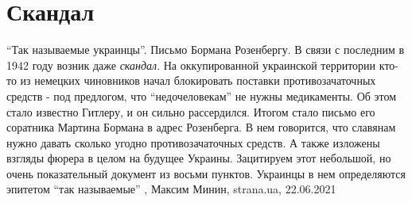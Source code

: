  
 
 
 
 
\chapter{Скандал}

\enquote{Так называемые украинцы}. Письмо Бормана Розенбергу.  В связи с последним в
1942 году возник даже \emph{скандал}. На оккупированной украинской территории кто-то
из немецких чиновников начал блокировать поставки противозачаточных средств -
под предлогом, что \enquote{недочеловекам} не нужны медикаменты.  Об этом стало
известно Гитлеру, и он сильно рассердился. Итогом стало письмо его соратника
Мартина Бормана в адрес Розенберга. В нем говорится, что славянам нужно давать
сколько угодно противозачаточных средств. А также изложены взгляды фюрера в
целом на будущее Украины.  Зацитируем этот небольшой, но очень показательный
документ из восьми пунктов. Украинцы в нем определяются эпитетом \enquote{так
называемые}
  , Максим Минин, strana.ua, 22.06.2021
